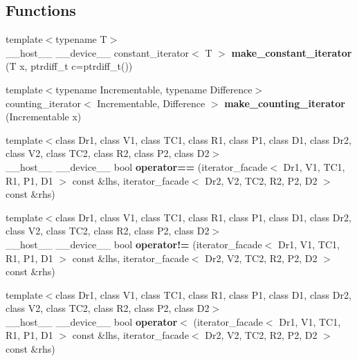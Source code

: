 \subsection*{Functions}
\begin{CompactItemize}
\item 
{\footnotesize template$<$typename T$>$ }\\\_\-\_\-host\_\-\_\- \_\-\_\-device\_\-\_\- constant\_\-iterator$<$ T $>$ \textbf{make\_\-constant\_\-iterator} (T x, ptrdiff\_\-t c=ptrdiff\_\-t())\label{namespacekomrade_1_1experimental_ee459d0d41235d9c3cf69258fc873d57}

\item 
{\footnotesize template$<$typename Incrementable, typename Difference$>$ }\\counting\_\-iterator$<$ Incrementable, Difference $>$ \textbf{make\_\-counting\_\-iterator} (Incrementable x)\label{namespacekomrade_1_1experimental_6b2d1b48130fda953643ec1914b0784a}

\item 
{\footnotesize template$<$class Dr1, class V1, class TC1, class R1, class P1, class D1, class Dr2, class V2, class TC2, class R2, class P2, class D2$>$ }\\\_\-\_\-host\_\-\_\- \_\-\_\-device\_\-\_\- bool \textbf{operator==} (iterator\_\-facade$<$ Dr1, V1, TC1, R1, P1, D1 $>$ const \&lhs, iterator\_\-facade$<$ Dr2, V2, TC2, R2, P2, D2 $>$ const \&rhs)\label{namespacekomrade_1_1experimental_c1d43437fbf28e33d0abd23a16765491}

\item 
{\footnotesize template$<$class Dr1, class V1, class TC1, class R1, class P1, class D1, class Dr2, class V2, class TC2, class R2, class P2, class D2$>$ }\\\_\-\_\-host\_\-\_\- \_\-\_\-device\_\-\_\- bool \textbf{operator!=} (iterator\_\-facade$<$ Dr1, V1, TC1, R1, P1, D1 $>$ const \&lhs, iterator\_\-facade$<$ Dr2, V2, TC2, R2, P2, D2 $>$ const \&rhs)\label{namespacekomrade_1_1experimental_12e5a9fb875a33b48b6afab86ef5f190}

\item 
{\footnotesize template$<$class Dr1, class V1, class TC1, class R1, class P1, class D1, class Dr2, class V2, class TC2, class R2, class P2, class D2$>$ }\\\_\-\_\-host\_\-\_\- \_\-\_\-device\_\-\_\- bool \textbf{operator$<$} (iterator\_\-facade$<$ Dr1, V1, TC1, R1, P1, D1 $>$ const \&lhs, iterator\_\-facade$<$ Dr2, V2, TC2, R2, P2, D2 $>$ const \&rhs)\label{namespacekomrade_1_1experimental_d2bff29a83045064df2eb5475078ff5e}


\end{CompactItemize}

